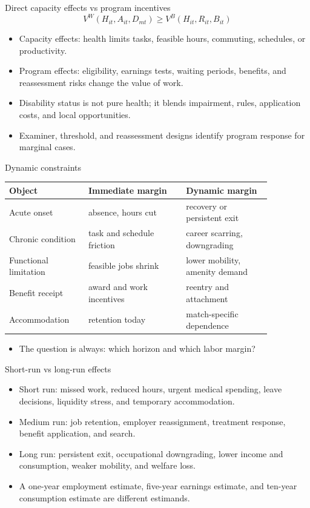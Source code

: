 \documentclass[aspectratio=169,11pt]{beamer}
\begin{document}
\begin{frame}{Direct capacity effects vs program incentives}
\small
\[
V^W(H_{it}, A_{it}, D_{mt}) \geq V^B(H_{it}, R_{it}, B_{it})
\]
\begin{itemize}
    \item Capacity effects: health limits tasks, feasible hours, commuting, schedules, or productivity.
    \item Program effects: eligibility, earnings tests, waiting periods, benefits, and reassessment risks change the value of work.
    \item Disability status is not pure health; it blends impairment, rules, application costs, and local opportunities.
    \item Examiner, threshold, and reassessment designs identify program response for marginal cases.
\end{itemize}
\end{frame}

\begin{frame}{Dynamic constraints}
\small
\begin{tabular}{p{0.25\linewidth} p{0.32\linewidth} p{0.29\linewidth}}
\toprule
Object & Immediate margin & Dynamic margin \\
\midrule
Acute onset & absence, hours cut & recovery or persistent exit \\
Chronic condition & task and schedule friction & career scarring, downgrading \\
Functional limitation & feasible jobs shrink & lower mobility, amenity demand \\
Benefit receipt & award and work incentives & reentry and attachment \\
Accommodation & retention today & match-specific dependence \\
\bottomrule
\end{tabular}
\vspace{0.3cm}
\begin{itemize}
    \item The question is always: which horizon and which labor margin?
\end{itemize}
\end{frame}

\begin{frame}{Short-run vs long-run effects}
\begin{itemize}
    \item Short run: missed work, reduced hours, urgent medical spending, leave decisions, liquidity stress, and temporary accommodation.
    \item Medium run: job retention, employer reassignment, treatment response, benefit application, and search.
    \item Long run: persistent exit, occupational downgrading, lower income and consumption, weaker mobility, and welfare loss.
    \item A one-year employment estimate, five-year earnings estimate, and ten-year consumption estimate are different estimands.
\end{itemize}
\end{frame}
\end{document}
